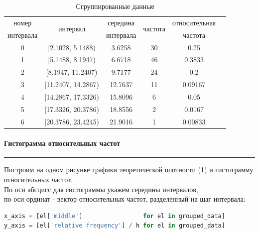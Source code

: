 \documentclass[a4paper, 14pt]{extarticle}
\begin{document}
\begin{table}[h!]
  \centering
  \renewcommand{\arraystretch}{1.5}
  \begin{adjustbox}{max width=0.8\textwidth}
      \begin{tabular}{|c|c|c|c|c|c|}
      \hline
      номер     & \multirow{2}{*}{интервал} & середина  & \multirow{2}{*}{частота} & относительная \\
      интервала &                           & интервала &                          & частота       \\
      \hline
      0 & [2.1028, 5.1488)   & 3.6258  & 30 & 0.25    \\
      \hline
      1 & [5.1488, 8.1947)   & 6.6718  & 46 & 0.3833  \\
      \hline
      2 & [8.1947, 11.2407)  & 9.7177  & 24 & 0.2     \\
      \hline
      3 & [11.2407, 14.2867) & 12.7637 & 11 & 0.09167 \\
      \hline
      4 & [14.2867, 17.3326) & 15.8096 & 6  & 0.05    \\
      \hline
      5 & [17.3326, 20.3786) & 18.8556 & 2  & 0.0167  \\
      \hline
      6 & [20.3786, 23.4245) & 21.9016 & 1  & 0.00833 \\
      \hline
      \end{tabular}
  \end{adjustbox}
  \caption{Сгруппированные данные}
  \label{tab:your_table_label}
\end{table}

\vfill

\newpage

\paragraph{Гистограмма относительных частот}\vspace{-20pt}\rule{\linewidth}{0.1mm}

Построим на одном рисунке графики теоретической плотности (1) и гистограмму относительных
частот. \\
По оси абсцисс для гистограммы укажем середины интервалов, \\
по оси ординат - вектор относительных частот, разделенный на шаг интервала: \\

\begin{center}
  \begin{lstlisting}[language=Python]
x_axis = [el['middle']                 for el in grouped_data]
y_axis = [el['relative frequency'] / h for el in grouped_data]
  \end{lstlisting}
\end{center}
\end{document}
